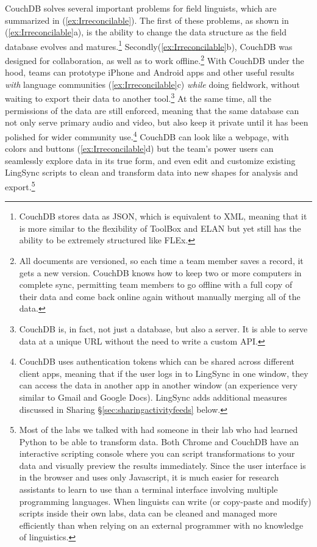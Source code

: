 \documentclass[letterpaper, 12pt, dvips]{mitwpl}
\begin{document}
CouchDB  solves several important problems for field linguists, which are summarized in (\ref{ex:Irreconcilable}). The first of these problems, as shown in (\ref{ex:Irreconcilable}a),  is the ability to change the data structure as the field database evolves
and matures.\footnote{CouchDB stores data as JSON, which is equivalent to XML, meaning that it is more similar to the flexibility of ToolBox and ELAN but yet still has the ability to be extremely structured like FLEx.} 
Secondly(\ref{ex:Irreconcilable}b), CouchDB was designed for collaboration,
as well as to work offline.\footnote{All documents are versioned, so each time a team member saves a record, it gets a new version. CouchDB knows how to keep two or more computers in complete sync, permitting team members to go offline with a full copy of their data and come back online again without manually merging all of the data.}
 With CouchDB under the hood, teams can prototype iPhone and Android apps  and other useful results \emph{with} language communities (\ref{ex:Irreconcilable}c) \emph{while} doing fieldwork, without waiting  to export their data to another tool.\footnote{CouchDB is, in fact, not just a database, but also a server. It is able to serve data at a unique URL without the need to write a custom API.} 
 At the same time, all the permissions of the data are still enforced,
 meaning that the same database can not only serve primary audio and video,
  but also keep it private until it has been polished for wider community use.\footnote{CouchDB uses authentication tokens which can be shared across different client apps, meaning that if the user logs in to LingSync in one window, they can access the data in another app in another window (an experience very similar to Gmail and Google Docs). LingSync adds additional measures discussed in Sharing \S \ref{sec:sharingactivityfeeds} below.}  
 CouchDB can look like a webpage, with colors and buttons (\ref{ex:Irreconcilable}d) but the team's power users can seamlessly explore data in its true form, and even edit and customize existing LingSync scripts to clean and transform data into new shapes for analysis and export.\footnote{Most of the labs we talked with had someone in their lab who had learned Python to be able to transform data. Both Chrome and CouchDB have an interactive scripting console where you can script transformations to your data and visually preview the results immediately. Since the user interface is in the browser and uses only Javascript, it is much easier for research assistants to learn to use than a terminal interface involving multiple programming languages. When linguists can write (or copy-paste and modify) scripts inside their own labs, data can be cleaned and managed more efficiently than when relying on an external programmer with no knowledge of linguistics.} 
\end{document}
